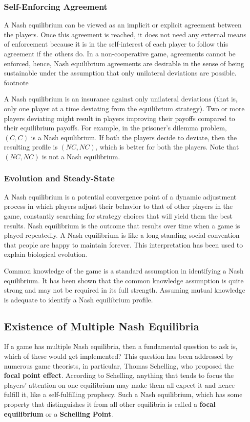 \subsubsection{Self-Enforcing Agreement}
A Nash equilibrium can be viewed as an implicit or explicit agreement between the players.
Once this agreement is reached, it does not need any external means of enforcement because it is in the self-interest of each player to follow this agreement if the others do.
In a non-cooperative game, agreements cannot be enforced, hence, Nash equilibrium agreements are desirable in the sense of being sustainable under the assumption that only unilateral deviations are possible.
footnote{A Nash equilibrium is an insurance against only unilateral deviations (that is, only one player at a time deviating from the equilibrium strategy).
Two or more players deviating might result in players improving their payoffs compared to their equilibrium payoffs.
For example, in the prisoner’s dilemma problem, $(C, C)$ is a Nash equilibrium.
If both the players decide to deviate, then the resulting profile is $(NC,NC)$, which is better for both the players.
Note that $(NC,NC)$ is not a Nash equilibrium.

\subsubsection{Evolution and Steady-State}
A Nash equilibrium is a potential convergence point of a dynamic adjustment process in which players adjust their behavior to that of other players in the game, constantly searching for strategy choices that will yield them the best results.
Nash equilibrium is the outcome that results over time when a game is played repeatedly.
A Nash equilibrium is like a long standing social convention that people are happy to maintain forever.
This interpretation has been used to explain biological evolution.
\begin{note}
	Common knowledge of the game is a standard assumption in identifying a Nash equilibrium.
	It has been shown that the common knowledge assumption is quite strong and may not be required in its full strength.
	Assuming mutual knowledge is adequate to identify a Nash equilibrium profile.
\end{note}
\subsection{Existence of Multiple Nash Equilibria}
If a game has multiple Nash equilibria, then a fundamental question to ask is, which of these would get implemented?
This question has been addressed by numerous game theorists, in particular, Thomas Schelling, who proposed the \textbf{focal point effect}.
According to Schelling, anything that tends to focus the players’ attention on one equilibrium may make them all expect it and hence fulfill it, like a self-fulfilling prophecy.
Such a Nash equilibrium, which has some property that distinguishes it from all other equilibria is called a \textbf{focal equilibrium} or a \textbf{Schelling Point}.
}
